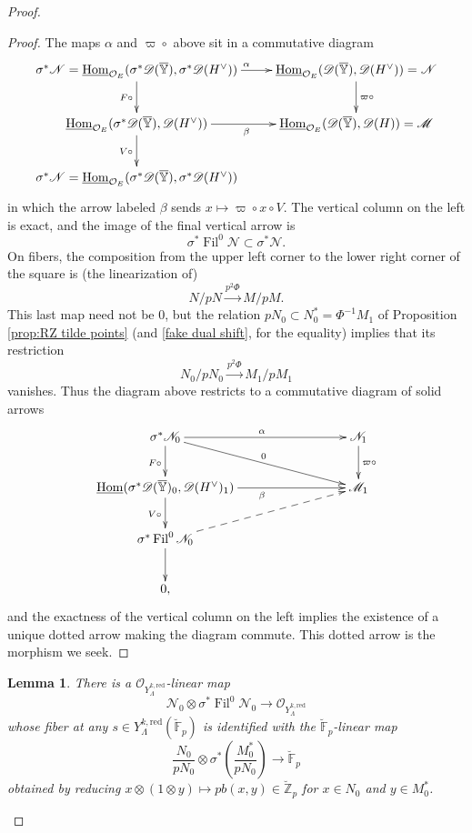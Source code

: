 \documentclass[10pt,a4paper]{amsart}
\newtheorem{lemma}{Lemma}
\newcommand{\F}{\mathbb F}
\DeclareMathOperator{\Fil}{Fil}
\DeclareMathOperator{\Hom}{Hom}
\newcommand{\Z}{\mathbb Z}
\newcommand{\co}{\mathcal O}
\newcommand{\map}[1]{\xrightarrow{#1}}
\newcommand{\red}{\mathrm{red}}
\begin{document}
\begin{proof}
\begin{proof}
The maps $\alpha$ and $\varpi \circ $ above sit in a commutative diagram
\[
\xymatrix{
{ \sigma^* \mathscr{N} =  \underline{\Hom}_{\co_E} ( \sigma^*\mathscr{D}(\overline{\mathbb{Y}} ) , \sigma^* \mathscr{D}(H^\vee) ) } \ar[r]^\alpha  \ar[d]_{ F \circ}
&
{  \underline{\Hom}_{\co_E} ( \mathscr{D}(\overline{\mathbb{Y}} ) ,  \mathscr{D}(H^\vee) ) = \mathscr{N} }  \ar[d]^{ \varpi  \circ }   \\
{  \underline{\Hom}_{\co_E} ( \sigma^*\mathscr{D}(\overline{\mathbb{Y}} ) ,   \mathscr{D}(H^\vee) ) } \ar[r]_\beta \ar[d]_{V\circ}
&
{  \underline{\Hom}_{\co_E} ( \mathscr{D}(\overline{\mathbb{Y}} ) ,  \mathscr{D}(H) )   = \mathscr{M} }   \\
{  \sigma^*\mathscr{N}= \underline{\Hom} _{\co_E}( \sigma^*\mathscr{D}(\overline{\mathbb{Y}} ) ,   \sigma^* \mathscr{D}(H^\vee) )  } 
}
\]
in  which the arrow labeled $\beta$ sends $x\mapsto \varpi \circ x \circ V$.
The vertical column on the left is exact, and the image of the final vertical arrow is 
\[
\sigma^* \Fil^0\mathscr{N} \subset \sigma^* \mathscr{N} .
\]
 On fibers, the  composition from the upper left corner to the lower right corner of the square is (the linearization of)
 \[
 N/pN \map{ p^2\Phi}  M/pM .
 \]
 This last map need not be $0$, but the relation $p N_0 \subset N_0^*=\Phi^{-1}M_1$ of Proposition \ref{prop:RZ tilde points} (and \eqref{fake dual shift}, for the equality) implies that its restriction
 \[
 N_0/pN_0 \map{ p^2\Phi}  M_1/pM_1
 \]
vanishes.  Thus the diagram above restricts to a commutative diagram of solid arrows
\[
\xymatrix{
{ \sigma^* \mathscr{N}_0 } \ar[rrr]^\alpha  \ar[d]_{ F \circ}   \ar[drrr]^0&   &  &   {   \mathscr{N}_1 }  \ar[d]^{ \varpi  \circ }   \\
{  \underline{\Hom} ( \sigma^*\mathscr{D}(\overline{\mathbb{Y}} )_0 ,   \mathscr{D}(H^\vee)_1 ) } \ar[rrr]_\beta  \ar[d]_{V\circ}
&  &   &   {  \mathscr{M}_1 }   \\
{  \sigma^* \Fil^0 \mathscr{N}_0 } \ar[d] \ar@{-->}[urrr]  \\
{ 0, }
}
\]
and the exactness of the vertical column on the left implies the existence of a unique dotted arrow making the diagram commute.  This dotted arrow is the morphism we seek.
\end{proof}




\begin{lemma}\label{lem:beta2}
There is a $\co_{Y^{k,\red}_\Lambda}$-linear map
\[
\mathscr{N}_0 \otimes \sigma^* \Fil^0 \mathscr{N}_0 \to \co_{Y^{k,\red}_\Lambda}
\]
whose fiber at any $s\in Y^{k,\red}_\Lambda(\breve{\F}_p)$ is identified with the $\breve{\F}_p$-linear map
\[
\frac{N_0}{pN_0} \otimes \sigma^*\left(    \frac{M_0^*}{pN_0} \right) \to \breve{\F}_p
\]
obtained by reducing $x\otimes (1\otimes y) \mapsto p b(x,y) \in \breve{\Z}_p$ for $x\in N_0$ and $y\in M_0^*$.
\end{lemma}


\end{proof}
\end{document}
